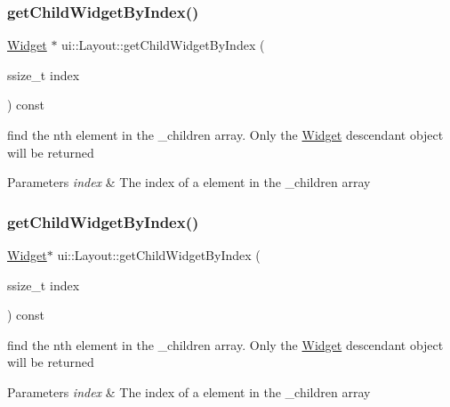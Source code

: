 \subsubsection{\texorpdfstring{get\+Child\+Widget\+By\+Index()}{getChildWidgetByIndex()}\hspace{0.1cm}{\footnotesize\ttfamily [1/2]}}
{\footnotesize\ttfamily \hyperlink{classui_1_1Widget}{Widget} $\ast$ ui\+::\+Layout\+::get\+Child\+Widget\+By\+Index (\begin{DoxyParamCaption}\item[{ssize\+\_\+t}]{index }\end{DoxyParamCaption}) const\hspace{0.3cm}{\ttfamily [protected]}}

find the nth element in the \+\_\+children array. Only the \hyperlink{classui_1_1Widget}{Widget} descendant object will be returned 
\begin{DoxyParams}{Parameters}
{\em index} & The index of a element in the \+\_\+children array \\
\hline
\end{DoxyParams}
\mbox{\label{classui_1_1Layout_a6c74f237486545399e9636e54f355444}} 
\subsubsection{\texorpdfstring{get\+Child\+Widget\+By\+Index()}{getChildWidgetByIndex()}\hspace{0.1cm}{\footnotesize\ttfamily [2/2]}}
{\footnotesize\ttfamily \hyperlink{classui_1_1Widget}{Widget}$\ast$ ui\+::\+Layout\+::get\+Child\+Widget\+By\+Index (\begin{DoxyParamCaption}\item[{ssize\+\_\+t}]{index }\end{DoxyParamCaption}) const\hspace{0.3cm}{\ttfamily [protected]}}

find the nth element in the \+\_\+children array. Only the \hyperlink{classui_1_1Widget}{Widget} descendant object will be returned 
\begin{DoxyParams}{Parameters}
{\em index} & The index of a element in the \+\_\+children array \\
\hline
\end{DoxyParams}
\mbox{\label{classui_1_1Layout_ab348b089c976c90499df4309a0b51624}} 
